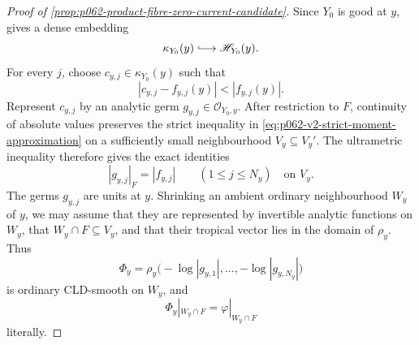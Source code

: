 \begin{proof}[Proof of \cref{prop:p062-product-fibre-zero-current-candidate}]
Since \(Y_0\) is good at \(y\), \cite[\S11.1.10]{CLD25} gives a dense
embedding
\[
                  \kappa_{Y_0}(y)\lhook\joinrel\longrightarrow
                  \mathscr H_{Y_0}(y).
\]
For every \(j\), choose \(c_{y,j}\in\kappa_{Y_0}(y)\) such that
\begin{equation}\label{eq:p062-v2-strict-moment-approximation}
 |c_{y,j}-f_{y,j}(y)|<|f_{y,j}(y)|.
\end{equation}
Represent \(c_{y,j}\) by an analytic germ
\(g_{y,j}\in\mathcal O_{Y_0,y}\). After restriction to \(F\), continuity
of absolute values preserves the strict inequality in
\eqref{eq:p062-v2-strict-moment-approximation} on a sufficiently small
neighbourhood \(V_y\subseteq V_y'\). The ultrametric inequality therefore
gives the exact identities
\begin{equation}\label{eq:p062-v2-exact-moment-norms}
             |g_{y,j}|_{F}=|f_{y,j}|\qquad(1\leq j\leq N_y)
             \quad\text{on }V_y.
\end{equation}
The germs \(g_{y,j}\) are units at \(y\). Shrinking an ambient ordinary
neighbourhood \(W_y\) of \(y\), we may assume that they are represented
by invertible analytic functions on \(W_y\), that
\(W_y\cap F\subseteq V_y\), and that their tropical vector lies in the
domain of \(\rho_y\). Thus
\[
 \Phi_y=\rho_y\bigl(-\log|g_{y,1}|,\ldots,
                         -\log|g_{y,N_y}|\bigr)
\]
is ordinary CLD-smooth on \(W_y\), and
\begin{equation}\label{eq:p062-v2-local-fibre-extension}
                      \Phi_y|_{W_y\cap F}=\varphi|_{W_y\cap F}
\end{equation}
literally.


\end{proof}
